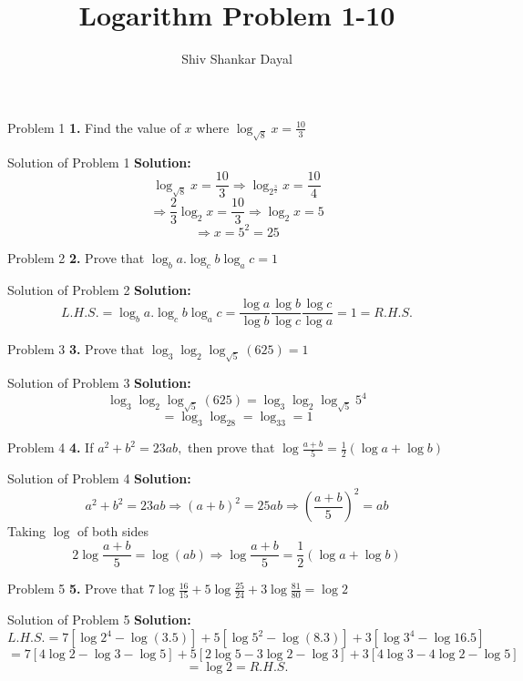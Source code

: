 \documentclass[aspectratio=1610,8pt]{beamer}
\title{Logarithm Problem 1-10}
\author[Shiv Shankar Dayal]{Shiv Shankar Dayal}
\begin{document}
\begin{frame}
  \titlepage
\end{frame}
\begin{frame}{Problem 1}
  \textbf{1.} Find the value of $x$ where $\log_{\sqrt{8}}x = \frac{10}{3}$
\end{frame}
\begin{frame}{Solution of Problem 1}
  \textbf{Solution:} $$\log_{\sqrt{8}}x = \frac{10}{3}\Rightarrow \log_{2^{\frac{3}{2}}}x = \frac{10}{4}$$
  $$\Rightarrow \frac{2}{3}\log_2 x = \frac{10}{3}\Rightarrow \log_2x = 5$$
  $$\Rightarrow x = 5^2 = 25$$
\end{frame}
\begin{frame}{Problem 2}
  \textbf{2.} Prove that $\log_ba.\log_cb\log_ac = 1$
\end{frame}
\begin{frame}{Solution of Problem 2}
  \textbf{Solution:} $$L.H.S. = \log_ba.\log_cb\log_ac = \frac{\log a}{\log b}\frac{\log b}{\log c}\frac{\log c}{\log a} = 1 = R.H.S.$$
\end{frame}
\begin{frame}{Problem 3}
  \textbf{3.} Prove that $\log_3\log_2\log_{\sqrt{5}}(625) = 1$
\end{frame}
\begin{frame}{Solution of Problem 3}
  \textbf{Solution:} $$\log_3\log_2\log_{\sqrt{5}}(625) = \log_3\log_2\log_{\sqrt{5}}5^4$$
  $$= \log_3\log_28 = \log_33 = 1$$
\end{frame}
\begin{frame}{Problem 4}
  \textbf{4.} If $a^2 + b^2 = 23ab,$ then prove that $\log \frac{a + b}{5} = \frac{1}{2}(\log a + \log b)$
\end{frame}
\begin{frame}{Solution of Problem 4}
  \textbf{Solution:} $$a^2 + b^2 = 23ab \Rightarrow (a + b)^2 = 25ab \Rightarrow \left(\frac{a + b}{5}\right)^2 = ab$$
  Taking $\log$ of both sides
  $$2\log\frac{a + b}{5} = \log(ab) \Rightarrow \log \frac{a + b}{5} = \frac{1}{2}(\log a + \log b)$$
\end{frame}
\begin{frame}{Problem 5}
  \textbf{5.} Prove that $7\log\frac{16}{15}+ 5\log\frac{25}{24} + 3\log\frac{81}{80} = \log 2$
\end{frame}
\begin{frame}{Solution of Problem 5}
  \textbf{Solution:} $$L.H.S. = 7[\log 2^4 - \log(3.5)] + 5[\log 5^2 - \log(8.3)] + 3[\log 3^4 - \log 16.5]$$
  $$= 7[4\log 2 - \log 3 - \log 5] + 5[2\log 5 - 3\log 2 - \log 3] + 3[4\log 3 - 4\log 2 - \log 5]$$
  $$= \log 2 = R.H.S.$$
\end{frame}
\end{document}
